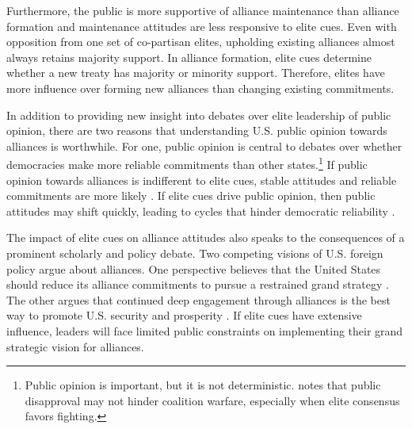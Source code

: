 \documentclass[12pt]{article}
\begin{document}
Furthermore, the public is more supportive of alliance maintenance than alliance formation and maintenance attitudes are less responsive to elite cues. 
Even with opposition from one set of co-partisan elites, upholding existing alliances almost always retains majority support. 
In alliance formation, elite cues determine whether a new treaty has majority or minority support. 
Therefore, elites have more influence over forming new alliances than changing existing commitments. 


In addition to providing new insight into debates over elite leadership of public opinion, there are two reasons that understanding U.S. public opinion towards alliances is worthwhile. 
For one, public opinion is central to debates over whether democracies make more reliable commitments than other states.\footnote{Public opinion is important, but it is not deterministic. \citet{Kreps2010} notes that public disapproval may not hinder coalition warfare, especially when elite consensus favors fighting.} 
If public opinion towards alliances is indifferent to elite cues, stable attitudes and reliable commitments are more likely \citep{Gaubatz1996}.
If elite cues drive public opinion, then public attitudes may shift quickly, leading to cycles that hinder democratic reliability \citep{GartzkeGleditsch2004}.


The impact of elite cues on alliance attitudes also speaks to the consequences of a prominent scholarly and policy debate. 
Two competing visions of U.S. foreign policy argue about alliances. 
One perspective believes that the United States should reduce its alliance commitments to pursue a restrained grand strategy \citep{Preble2009, Posen2014}.
The other argues that continued deep engagement through alliances is the best way to promote U.S. security and prosperity \citep{Brooksetal2013, BrandsFeaver2017}. 
If elite cues have extensive influence, leaders will face limited public constraints on implementing their grand strategic vision for alliances. 
\end{document}
